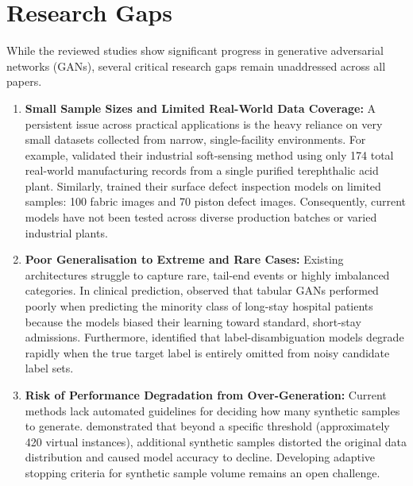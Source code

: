 \documentclass[12pt,a4paper]{article}
\begin{document}

\section{Research Gaps}

While the reviewed studies show significant progress in generative adversarial networks (GANs), several critical research gaps remain unaddressed across all papers.

\begin{enumerate}
    \item \textbf{Small Sample Sizes and Limited Real-World Data Coverage:}
    A persistent issue across practical applications is the heavy reliance on very small datasets collected from narrow, single-facility environments. For example, \textcite{zhu2025novel} validated their industrial soft-sensing method using only 174 total real-world manufacturing records from a single purified terephthalic acid plant. Similarly, \textcite{li2023eid} trained their surface defect inspection models on limited samples: 100 fabric images and 70 piston defect images. Consequently, current models have not been tested across diverse production batches or varied industrial plants.

    \item \textbf{Poor Generalisation to Extreme and Rare Cases:}
    Existing architectures struggle to capture rare, tail-end events or highly imbalanced categories. In clinical prediction, \textcite{bietsch2023electronic} observed that tabular GANs performed poorly when predicting the minority class of long-stay hospital patients because the models biased their learning toward standard, short-stay admissions. Furthermore, \textcite{zhang2023inaccurate} identified that label-disambiguation models degrade rapidly when the true target label is entirely omitted from noisy candidate label sets.

    \item \textbf{Risk of Performance Degradation from Over-Generation:}
    Current methods lack automated guidelines for deciding how many synthetic samples to generate. \textcite{zhu2025novel} demonstrated that beyond a specific threshold (approximately 420 virtual instances), additional synthetic samples distorted the original data distribution and caused model accuracy to decline. Developing adaptive stopping criteria for synthetic sample volume remains an open challenge.


\end{enumerate}
\end{document}
